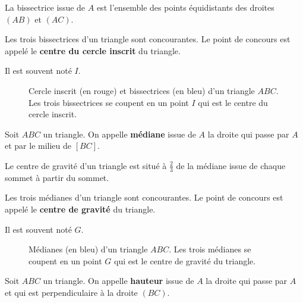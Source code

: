 \documentclass[a4paper,12pt]{article}
\begin{document}
\begin{proposition}{}{}
    La bissectrice issue de $A$ est l'ensemble des points équidistants des droites $(AB)$ et $(AC)$.
\end{proposition}

\begin{theoreme}{}{}
    Les trois bissectrices d'un triangle sont concourantes. Le point de concours est appelé le \textbf{centre du cercle inscrit} du triangle.
    
    Il est souvent noté $I$.
\end{theoreme}

\tikzexternalenable
\begin{figure}[H]
    \centering
    \resizebox{0.6\textwidth}{!}{%
    
    }
    \caption{Cercle inscrit (en rouge) et bissectrices (en bleu) d'un triangle $ABC$. Les trois bissectrices se coupent en un point $I$ qui est le centre du cercle inscrit.}
\end{figure}
\tikzexternaldisable

\begin{definition}
    Soit $ABC$ un triangle. On appelle \textbf{médiane} issue de $A$ la droite qui passe par $A$ et par le milieu de $[BC]$.
\end{definition}

\begin{proposition}{}{}
    Le centre de gravité d'un triangle est situé à $\frac{2}{3}$ de la médiane issue de chaque sommet à partir du sommet.
\end{proposition}

\begin{theoreme}{}{}
    Les trois médianes d'un triangle sont concourantes. Le point de concours est appelé le \textbf{centre de gravité} du triangle.
    
    Il est souvent noté $G$.
\end{theoreme}

\tikzexternalenable
\begin{figure}[H]
    \centering
    \resizebox{0.6\textwidth}{!}{%
    
    }
    \caption{Médianes (en bleu) d'un triangle $ABC$. Les trois médianes se coupent en un point $G$ qui est le centre de gravité du triangle.}
\end{figure}
\tikzexternaldisable

\begin{definition}
    Soit $ABC$ un triangle. On appelle \textbf{hauteur} issue de $A$ la droite qui passe par $A$ et qui est perpendiculaire à la droite $(BC)$.
\end{definition}
\end{document}

